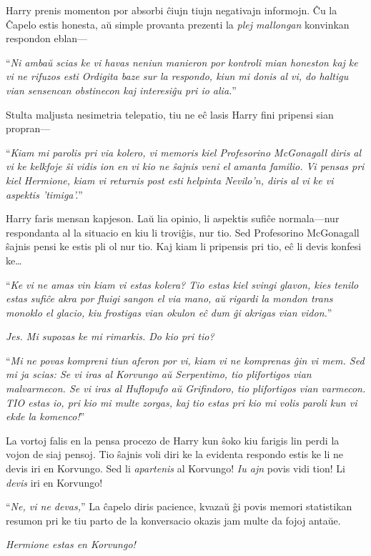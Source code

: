 Harry prenis momenton por absorbi ĉiujn tiujn negativajn informojn. Ĉu
la Ĉapelo estis honesta, aŭ simple provanta prezenti la \emph{plej
  mallongan} konvinkan respondon eblan—

``\emph{Ni ambaŭ scias ke vi havas neniun manieron por kontroli mian
  honeston kaj ke vi ne rifuzos esti Ordigita baze sur la respondo,
  kiun mi donis al vi, do haltigu vian sensencan obstinecon kaj
  interesiĝu pri io alia.}''

Stulta maljusta nesimetria telepatio, tiu ne eĉ lasis Harry fini
pripensi sian propran—

``\emph{Kiam mi parolis pri via kolero, vi memoris kiel Profesorino
  McGonagall diris al vi ke kelkfoje ŝi vidis ion en vi kio ne ŝajnis
  veni el amanta familio. Vi pensas pri kiel Hermione, kiam vi
  returnis post esti helpinta Nevilo'n, diris al vi ke vi aspektis
  'timiga'.}''

Harry faris mensan kapjeson. Laŭ lia opinio, li aspektis sufiĉe
normala—nur respondanta al la situacio en kiu li troviĝis, nur
tio. Sed Profesorino McGonagall ŝajnis pensi ke estis pli ol nur
tio. Kaj kiam li pripensis pri tio, eĉ li devis konfesi ke\ldots

``\emph{Ke vi ne amas vin kiam vi estas kolera? Tio estas kiel svingi
  glavon, kies tenilo estas sufiĉe akra por fluigi sangon el via mano,
  aŭ rigardi la mondon trans monoklo el glacio, kiu frostigas vian
  okulon eĉ dum ĝi akrigas vian vidon.}''

\emph{Jes. Mi supozas ke mi rimarkis. Do kio pri tio?}

``\emph{Mi ne povas kompreni tiun aferon por vi, kiam vi ne komprenas
  ĝin vi mem. Sed mi ja scias: Se vi iras al Korvungo aŭ Serpentimo,
  tio plifortigos vian malvarmecon. Se vi iras al Huflopufo aŭ
  Grifindoro, tio plifortigos vian varmecon. TIO estas io, pri kio mi
  multe zorgas, kaj tio estas pri kio mi volis paroli kun vi ekde la
  komenco!}''

La vortoj falis en la pensa procezo de Harry kun ŝoko kiu farigis lin
perdi la vojon de siaj pensoj. Tio ŝajnis voli diri ke la evidenta
respondo estis ke li ne devis iri en Korvungo.  Sed li
\emph{apartenis} al Korvungo!  \emph{Iu ajn} povis vidi tion! Li
\emph{devis} iri en Korvungo!

``\emph{Ne, vi ne devas,}'' La ĉapelo diris pacience, kvazaŭ ĝi povis
memori statistikan resumon pri ke tiu parto de la konversacio okazis
jam multe da fojoj antaŭe.

\emph{Hermione estas en Korvungo!}


